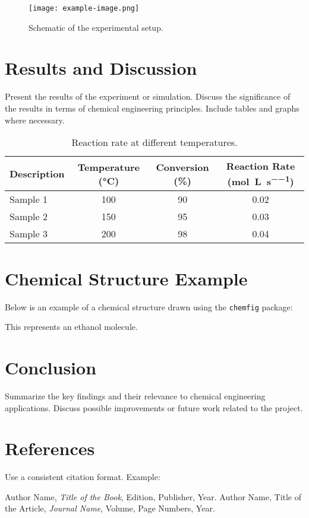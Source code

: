 \documentclass[a4paper, 12pt]{article}
\begin{document}
\begin{figure}[H]
    \centering
    \texttt{[image: example-image.png]}
    \caption{Schematic of the experimental setup.}
    \label{fig:setup}
\end{figure}

\lipsum[4]  %

\section{Results and Discussion}
Present the results of the experiment or simulation. Discuss the significance of the results in terms of chemical engineering principles. Include tables and graphs where necessary.

\begin{table}[H]
    \centering
    \begin{tabularx}{\linewidth}{Xccc}
    \toprule
    Description & Temperature (\si{\celsius}) & Conversion (\%) & Reaction Rate (\si{\mole\per\liter\per\second}) \\
    \midrule
    Sample 1 & 100 & 90 & 0.02 \\
    Sample 2 & 150 & 95 & 0.03 \\
    Sample 3 & 200 & 98 & 0.04 \\
    \bottomrule
    \end{tabularx}
    \caption{Reaction rate at different temperatures.}
    \label{tab:results}
\end{table}

\section{Chemical Structure Example}
Below is an example of a chemical structure drawn using the \texttt{chemfig} package:

\begin{center}
\end{center}

This represents an ethanol molecule.

\section{Conclusion}
Summarize the key findings and their relevance to chemical engineering applications. Discuss possible improvements or future work related to the project.

\lipsum[5]  %

\section{References}
Use a consistent citation format. Example:

\begin{thebibliography}{9}
 Author Name, \emph{Title of the Book}, Edition, Publisher, Year.
 Author Name, Title of the Article, \emph{Journal Name}, Volume, Page Numbers, Year.
\end{thebibliography}
\end{document}
